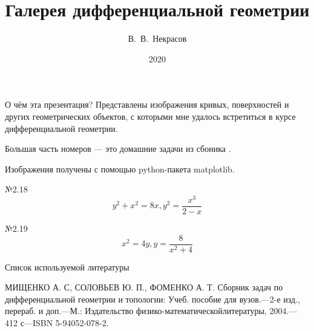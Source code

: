 ﻿\documentclass[10pt]{beamer}
\title{Галерея дифференциальной геометрии}
\institute{Механико-математический факультет МГУ}
\author{В.~В.~Некрасов}
\date{2020}
\begin{document}
\begin{frame}
\titlepage
\end{frame}

\begin{frame}{О чём эта презентация?}
Представлены изображения кривых, поверхностей и других геометрических объектов, с которыми мне удалось встретиться в курсе дифференциальной геометрии.

Большая часть номеров --- это домашние задачи из сбоника \cite{1}.

Изображения получены с помощью python-пакета matplotlib.
\end{frame}

\begin{frame}{№2.18 \cite{1}}
  \[y^2+x^2=8x, y^2=\frac{x^3}{2-x}\]
	\centering

\end{frame}

\begin{frame}{№2.19 \cite{1}}
  \[x^2=4y, y=\frac{8}{x^2+4}\]
	\centering

\end{frame}

\begin{frame}{Список используемой литературы}
\begin{thebibliography}{3} 
 МИЩЕНКО А. С, СОЛОВЬЕВ Ю. П., ФОМЕНКО А. Т. Сборник задач по дифференциальной геометрии и топологии: Учеб. пособие для вузов.—2-е изд., перераб. и доп.—М.: Издательство физико-математическойлитературы, 2004.—412 с—ISBN 5-94052-078-2.
\end{thebibliography}

\end{frame}
\end{document}
